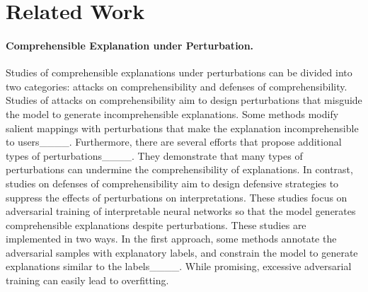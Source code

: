 \section{Related Work}
\label{section-Related Work}
\paragraph{Comprehensible Explanation under Perturbation.}
Studies of comprehensible explanations under perturbations can be divided into two categories: attacks on comprehensibility and defenses of comprehensibility.
Studies of attacks on comprehensibility aim to design perturbations that misguide the model to generate incomprehensible explanations.
Some methods modify salient mappings with perturbations that make the explanation incomprehensible to users____. 
Furthermore, there are several efforts that propose additional types of perturbations____.
They demonstrate that many types of perturbations can undermine the comprehensibility of explanations. 
In contrast, studies on defenses of comprehensibility aim to design defensive strategies to suppress the effects of perturbations on interpretations.
These studies focus on adversarial training of interpretable neural networks so that the model generates comprehensible explanations despite perturbations. 
These studies are implemented in two ways. 
In the first approach, some methods annotate the adversarial samples with explanatory labels, and constrain the model to generate explanations similar to the labels____.
While promising, excessive adversarial training can easily lead to overfitting.
